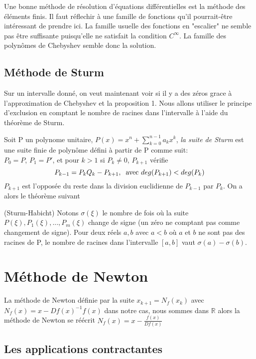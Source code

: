 \documentclass[a4paper,10.5pt]{article}
\begin{document}
	Une bonne méthode de résolution d'équations différentielles est la méthode des éléments finis. Il faut réflechir à une famille de fonctions qu'il pourrait-être intéressant de prendre ici. La famille usuelle des fonctions en "escalier" ne semble pas être suffisante puisqu'elle ne satisfait la condition $C^{\infty}$.
	La famille des polynômes de Chebyshev semble donc la solution.
	
	\subsection{Méthode de Sturm}
	
	Sur un intervalle donné, on veut maintenant voir si il y a des zéros grace à l'approximation de Chebyshev et la proposition 1. Nous allons utiliser le principe d'exclusion en comptant le nombre de racines dans l'intervalle à l'aide du théorème de Sturm.
	
	
	Soit P un polynome unitaire, $P(x)=x^{n} + \sum^{n-1}_{k=0}a_{k}x^{k}$, \textit {la suite de Sturm} est une suite finie de polynôme défini à partir de P comme suit:\\
	$P_{0}=P$, $P_{1}=P'$, et pour $k > 1$ si $P_{k} \neq 0$,  $P_{k+1}$ vérifie
	\[P_{k-1}=P_{k}Q_{k}-P_{k+1},\hspace{2mm}\text{avec }    deg(P_{k+1})<deg(P_{k})\] 
	$P_{k+1}$ est l'opposée du reste dans la division euclidienne de $P_{k-1}$ par $P_{k}$. On a alors le théorème suivant 
	

	\begin{theorem}(Sturm-Habicht)
		Notons $\sigma(\xi)$ le nombre de fois où la suite $P(\xi),P_{1}(\xi),...,P_{m}(\xi)$ change de signe (un zéro ne comptant pas comme changement de signe).
		Pour deux réels $a,b$ avec $a<b$ où $a$ et $b$ ne sont pas des racines de P, le nombre de racines dans l'intervalle $[a,b]$ vaut
		$\sigma(a)-\sigma(b)$.
	\end{theorem}
	
	\section{Méthode de Newton}
	
	La méthode de Newton définie par la suite $x_{k+1}=N_{f}(x_{k})$ avec $N_{f}(x)=x-Df(x)^{-1}f(x)$ dans notre cas, nous sommes dans $\mathbb{R}$ alors la méthode de Newton se réécrit $N_{f}(x)=x-\frac{f(x)}{Df(x)}$ 
	
	\subsection{Les applications contractantes}
	
\end{document}
